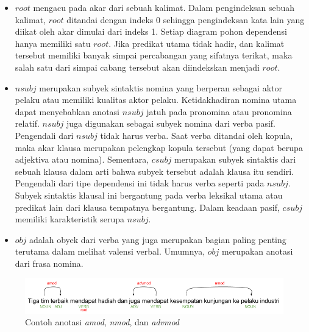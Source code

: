 \begin{itemize}
\item $root$ mengacu pada akar dari sebuah kalimat. Dalam pengindeksan sebuah kalimat, $root$ ditandai dengan indeks 0 sehingga pengindeksan kata lain yang diikat oleh akar dimulai dari indeks 1. Setiap diagram pohon dependensi hanya memiliki satu $root$. Jika predikat utama tidak hadir, dan kalimat tersebut memiliki banyak simpai percabangan yang sifatnya terikat, maka salah satu dari simpai cabang tersebut akan diindekskan menjadi $root$.
\item $nsubj$ merupakan subyek sintaktis nomina yang berperan sebagai aktor pelaku atau memiliki kualitas aktor pelaku. Ketidakhadiran nomina utama dapat menyebabkan anotasi $nsubj$ jatuh pada pronomina atau pronomina relatif. $nsubj$ juga digunakan sebagai subyek nomina dari verba pasif. Pengendali dari $nsubj$ tidak harus verba. Saat verba ditandai oleh kopula, maka akar klausa merupakan pelengkap kopula tersebut (yang dapat berupa adjektiva atau nomina). Sementara, $csubj$ merupakan subyek sintaktis dari sebuah klausa dalam arti bahwa subyek tersebut adalah klausa itu sendiri. Pengendali dari tipe dependensi ini tidak harus verba seperti pada $nsubj$. Subyek sintaktis klausal ini bergantung pada verba leksikal utama atau predikat lain dari klausa tempatnya bergantung. Dalam keadaan pasif, $csubj$ memiliki karakteristik serupa $nsubj$.
\item $obj$ adalah obyek dari verba yang juga merupakan bagian paling penting terutama dalam melihat valensi verbal. Umumnya, $obj$ merupakan anotasi dari frasa nomina.
\end{itemize}

\begin{figure}
	\centering \includegraphics[width=1
	\textwidth] {pics/anotasiamod.png} \caption{Contoh anotasi \textit{amod}, \textit{nmod}, dan \textit{advmod}} 
\label{fig:anotasiamod} 
\end{figure}

